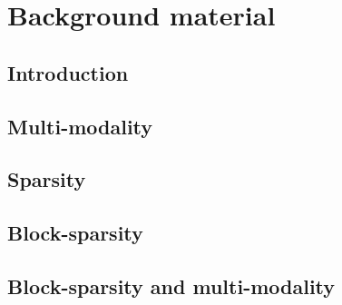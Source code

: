 \chapter{Background material}
\label{chap:1-Background}
\minitoc

\section{Introduction}


\section{Multi-modality}
\label{sec:Multimodality}


\section{Sparsity}
\label{sec:Sparsity}


\section{Block-sparsity}
\label{sec:Block-sparsity} 

\newpage

\section{Block-sparsity and multi-modality}
\label{sec:Block-sparsity-multimodality} 
